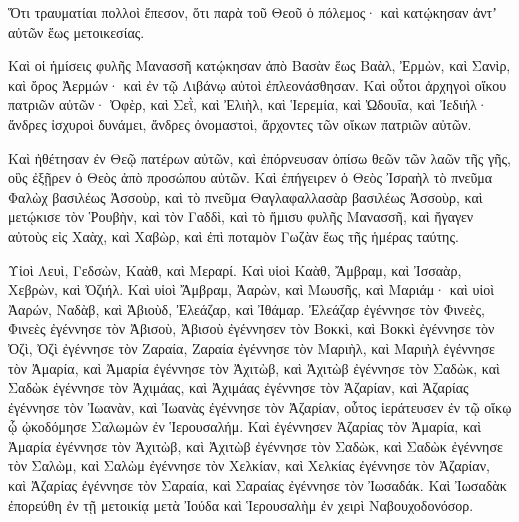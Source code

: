 {Ὅτι τραυματίαι πολλοὶ ἔπεσον, ὅτι παρὰ τοῦ Θεοῦ ὁ πόλεμος· καὶ κατῴκησαν ἀντʼ αὐτῶν ἕως μετοικεσίας.
\par }{\PP {}Καὶ οἱ ἡμίσεις φυλῆς Μανασσῆ κατῴκησαν ἀπὸ Βασὰν ἕως Βαὰλ, Ἐρμὼν, καὶ Σανὶρ, καὶ ὄρος Ἀερμών· καὶ ἐν τῷ Λιβάνῳ αὐτοὶ ἐπλεονάσθησαν.
Καὶ οὗτοι ἀρχηγοὶ οἴκου πατριῶν αὐτῶν· Ὀφὲρ, καὶ Σεῒ, καὶ Ἐλιὴλ, καὶ Ἱερεμία, καὶ Ὠδουΐα, καὶ Ἰεδιήλ· ἄνδρες ἰσχυροὶ δυνάμει, ἄνδρες ὀνομαστοὶ, ἄρχοντες τῶν οἴκων πατριῶν αὐτῶν.
\par }{\PP {}Καὶ ἠθέτησαν ἐν Θεῷ πατέρων αὐτῶν, καὶ ἐπόρνευσαν ὀπίσω θεῶν τῶν λαῶν τῆς γῆς, οὓς ἐξῇρεν ὁ Θεὸς ἀπὸ προσώπου αὐτῶν.
Καὶ ἐπήγειρεν ὁ Θεὸς Ἰσραὴλ τὸ πνεῦμα Φαλὼχ βασιλέως Ἀσσοὺρ, καὶ τὸ πνεῦμα Θαγλαφαλλασὰρ βασιλέως Ἀσσοὺρ, καὶ μετῴκισε τὸν Ῥουβὴν, καὶ τὸν Γαδδὶ, καὶ τὸ ἥμισυ φυλῆς Μανασσῆ, καὶ ἤγαγεν αὐτοὺς εἰς Χαὰχ, καὶ Χαβὼρ, καὶ ἐπὶ ποταμὸν Γωζὰν ἕως τῆς ἡμέρας ταύτης.
\par }{\PP {}Υἱοὶ Λευὶ, Γεδσὼν, Καὰθ, καὶ Μεραρί.
Καὶ υἱοὶ Καὰθ, Ἄμβραμ, καὶ Ἰσσαὰρ, Χεβρὼν, καὶ Ὀζιήλ.
Καὶ υἱοὶ Ἄμβραμ, Ἀαρὼν, καὶ Μωυσῆς, καὶ Μαριάμ· καὶ υἱοὶ Ἀαρών, Ναδὰβ, καὶ Ἀβιοὺδ, Ἐλεάζαρ, καὶ Ἰθάμαρ.
Ἐλεάζαρ ἐγέννησε τὸν Φινεὲς, Φινεὲς ἐγέννησε τὸν Ἀβισοὺ,
Ἀβισοὺ ἐγέννησεν τὸν Βοκκὶ, καὶ Βοκκὶ ἐγέννησε τὸν Ὀζὶ,
Ὀζὶ ἐγέννησε τὸν Ζαραία, Ζαραία ἐγέννησε τὸν Μαριὴλ,
καὶ Μαριὴλ ἐγέννησε τὸν Ἀμαρία, καὶ Ἀμαρία ἐγέννησε τὸν Ἀχιτὼβ,
καὶ Ἀχιτὼβ ἐγέννησε τὸν Σαδὼκ, καὶ Σαδὼκ ἐγέννησε τὸν Ἀχιμάας,
καὶ Ἀχιμάας ἐγέννησε τὸν Ἀζαρίαν, καὶ Ἀζαρίας ἐγέννησε τὸν Ἰωανὰν,
καὶ Ἰωανὰς ἐγέννησε τὸν Ἀζαρίαν, οὗτος ἱεράτευσεν ἐν τῷ οἴκῳ ᾧ ᾠκοδόμησε Σαλωμὼν ἐν Ἱερουσαλήμ.
Καὶ ἐγέννησεν Ἀζαρίας τὸν Ἀμαρία, καὶ Ἀμαρία ἐγέννησε τὸν Ἀχιτὼβ,
καὶ Ἀχιτὼβ ἐγέννησε τὸν Σαδὼκ, καὶ Σαδὼκ ἐγέννησε τὸν Σαλὼμ,
καὶ Σαλὼμ ἐγέννησε τὸν Χελκίαν, καὶ Χελκίας ἐγέννησε τὸν Ἀζαρίαν,
καὶ Ἀζαρίας ἐγέννησε τὸν Σαραία, καὶ Σαραίας ἐγέννησε τὸν Ἰωσαδάκ.
Καὶ Ἰωσαδὰκ ἐπορεύθη ἐν τῇ μετοικίᾳ μετὰ Ἰούδα καὶ Ἱερουσαλὴμ ἐν χειρὶ Ναβουχοδονόσορ.

}
